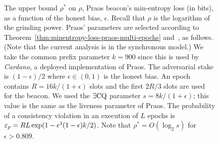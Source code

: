 

\begin{figure}[!htb]
    \centering
    \caption[Praos beacon]{
        The upper bound $\rho^*$ on $\rho$, 
        Praos beacon's min-entropy loss (in bits), 
        as a function of the honest bias, $\epsilon$. 
        Recall that $\rho$ is the logarithm of the grinding power.     
        Praos' parameters are selected according to Theorem~\ref{thm:minentropy-loss-praos-multi-epochs} 
        and~\citet[Theorem 9]{Praos}, as follows.
        (Note that the current analysis is in the synchronous model.)
        We take the common prefix parameter $k = 900$ since 
        this is used by \emph{Cardano}, a deployed implementation of Praos. 
        The adversarial stake is $(1-\epsilon)/2$ where $\epsilon \in (0,1)$ is the honest bias.
        An epoch contains $R = 16 k/(1+\epsilon)$ slots and the first $2R/3$ slots are used for the beacon. 
        We used the $\exists\mathrm{CQ}$ parameter $s = 8 k/(1+\epsilon)$; 
        this value is the same as the liveness parameter of Praos. 
        The probability of a consistency violation in an execution of $L$ epochs is 
        $\mathsf{\varepsilon}_p = R L \exp(1-\epsilon^3 (1-\epsilon)k/2) $. 
        Note that $\rho^* = O(\log_2 s)$ for $\epsilon > 0.809$.
    }
    \label{fig:rho-praos-beacon}
\end{figure}
